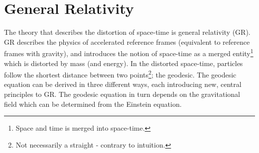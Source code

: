 \chapter{General Relativity}
The theory that describes the distortion of space-time is general relativity (GR). GR describes the physics of accelerated reference frames (equivalent to reference frames with gravity), and introduces the notion of space-time as a merged entity\footnote{Space and time is merged into space-time.} which is distorted by mass (and energy). In the distorted space-time, particles follow the shortest distance between two points\footnote{Not necessarily a straight - contrary to intuition.}; the geodesic. The geodesic equation can be derived in three different ways, each introducing new, central principles to GR. The geodesic equation in turn depends on the gravitational field which can be determined from the Einstein equation.

